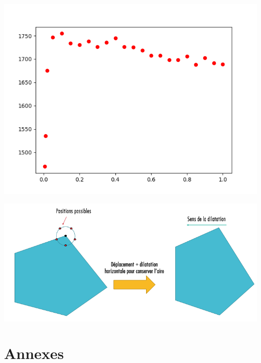 \documentclass[a4paper,reqno]{article}
\newcommand{\pa}{\hspace{0.5cm}}
\begin{document}
\begin{center}
\includegraphics[scale=0.5]{plotPas.png}
\end{center}

\begin{center}
\includegraphics[scale=0.5]{alternatif.png}
\end{center}


\newpage

\pa 






\section*{Annexes}

\end{document}
